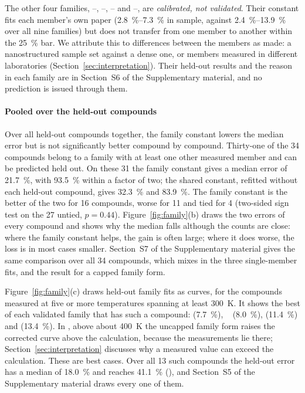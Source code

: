 The other four families, --, --, -- and --,
are \emph{calibrated, not validated}. Their constant fits each member's own paper
(\SIrange{2.8}{7.3}{\percent} in sample, against \SIrange{2.4}{13.9}{\percent} over all nine
families) but does not transfer from one member to another within the \SI{25}{\percent} bar. We
attribute this to differences between the members as made: a nanostructured sample set against a
dense one, or members measured in different laboratories (Section~\ref{sec:interpretation}). Their
held-out results and the reason in each family are in Section~S6 of the Supplementary material, and
no prediction is issued through them.

\paragraph{Pooled over the held-out compounds} Over all held-out compounds together, the family
constant lowers the median error but is not significantly better compound by compound. Thirty-one of
the \num{34} compounds belong to a family with at least one other measured member and can be
predicted held out. On these \num{31} the family constant gives a median error of
\SI{21.7}{\percent}, with \SI{93.5}{\percent} within a factor of two; the shared constant, refitted
without each held-out compound, gives \SI{32.3}{\percent} and \SI{83.9}{\percent}. The family
constant is the better of the two for \num{16} compounds, worse for \num{11} and tied for \num{4}
(two-sided sign test on the \num{27} untied, $p=\num{0.44}$). Figure~\ref{fig:family}(b) draws the
two errors of every compound and shows why the median falls although the counts are close: where
the family constant helps, the gain is often large; where it does worse, the loss is in most
cases smaller.
Section~S7 of the Supplementary material gives the same comparison over all \num{34} compounds,
which mixes in the three single-member fits, and the result for a capped family form.

Figure~\ref{fig:family}(c) draws held-out family fits as curves, for the compounds measured at
five or more temperatures spanning at least \SI{300}{\kelvin}. It shows the best of each
validated family that has such a compound:  (\SI{7.7}{\percent}),
~\cite{ciesielski2020thermoelec} (\SI{8.0}{\percent}), 
(\SI{11.4}{\percent}) and  (\SI{13.4}{\percent}). In , above about
\SI{400}{\kelvin} the uncapped family form raises the corrected curve above the calculation,
because the measurements lie there; Section~\ref{sec:interpretation} discusses why a measured
value can exceed the calculation. These are best cases. Over all \num{13} such compounds the
held-out error has a median of \SI{18.0}{\percent} and reaches \SI{41.1}{\percent}
(), and Section~S5 of the Supplementary material draws every one of them.


